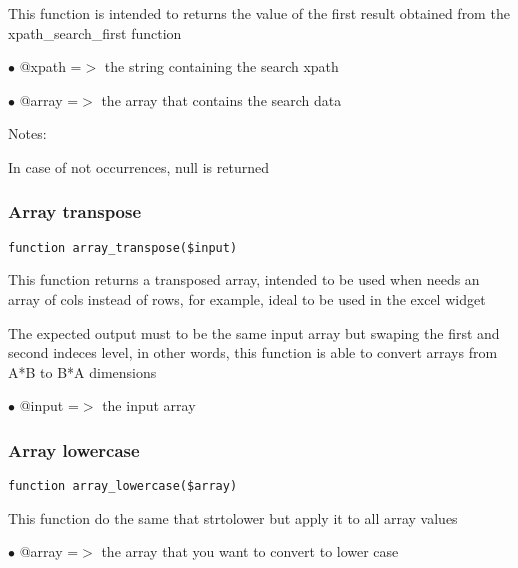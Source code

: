 \documentclass[a4paper]{article}
\begin{document}
This function is intended to returns the value of the first
result obtained from the xpath\_search\_first function

\begin{compactitem}
\item[\color{myblue}$\bullet$] @xpath =$>$ the string containing the search xpath
\item[\color{myblue}$\bullet$] @array =$>$ the array that contains the search data
\end{compactitem}

Notes:

In case of not occurrences, null is returned

\hypertarget{toc67}{}
\subsubsection{Array transpose}

\begin{lstlisting}
function array_transpose($input)
\end{lstlisting}

This function returns a transposed array, intended to be used
when needs an array of cols instead of rows, for example, ideal
to be used in the excel widget

The expected output must to be the same input array but swaping
the first and second indeces level, in other words, this function
is able to convert arrays from A*B to B*A dimensions

\begin{compactitem}
\item[\color{myblue}$\bullet$] @input =$>$ the input array
\end{compactitem}

\hypertarget{toc68}{}
\subsubsection{Array lowercase}

\begin{lstlisting}
function array_lowercase($array)
\end{lstlisting}

This function do the same that strtolower but apply it to all array values

\begin{compactitem}
\item[\color{myblue}$\bullet$] @array =$>$ the array that you want to convert to lower case
\end{compactitem}
\end{document}
